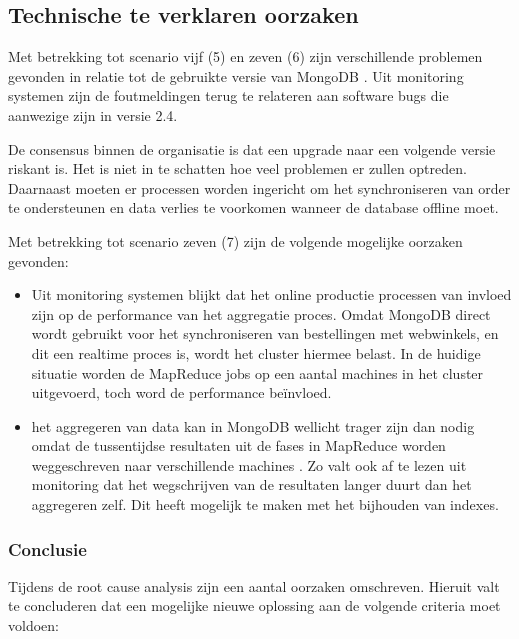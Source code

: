 \clearpage

\subsection{Technische te verklaren oorzaken}

Met betrekking tot scenario vijf (5) en zeven (6) zijn verschillende problemen gevonden in relatie tot de gebruikte versie van MongoDB \parencite{mongo_changelog}. Uit monitoring systemen zijn de foutmeldingen terug te relateren aan software bugs die aanwezige zijn in versie 2.4.

De consensus binnen de organisatie is dat een upgrade naar een volgende versie riskant is. Het is niet in te schatten hoe veel problemen er zullen optreden. Daarnaast moeten er processen worden ingericht om het synchroniseren van order te ondersteunen en data verlies te voorkomen wanneer de database offline moet.
    
Met betrekking tot scenario zeven (7) zijn de volgende mogelijke oorzaken gevonden:

\begin{itemize}
    \item Uit monitoring systemen blijkt dat het online productie processen van invloed zijn op de performance van het aggregatie proces. Omdat MongoDB direct wordt gebruikt voor het synchroniseren van bestellingen met webwinkels, en dit een realtime proces is, wordt het cluster hiermee belast. In de huidige situatie worden de MapReduce jobs op een aantal machines in het cluster uitgevoerd, toch word de performance beïnvloed.
    \item het aggregeren van data kan in MongoDB wellicht trager zijn dan nodig omdat de tussentijdse resultaten uit de fases in MapReduce worden weggeschreven naar verschillende machines \parencite{mongo_mr_shards}. Zo valt ook af te lezen uit monitoring dat het wegschrijven van de resultaten langer duurt dan het aggregeren zelf. Dit heeft mogelijk te maken met het bijhouden van indexes.  \parencite{mongo_write_performance}
\end{itemize}


\subsubsection{\textbf{Conclusie}}
\label{subsec:3.3.2}

Tijdens de root cause analysis zijn een aantal oorzaken omschreven. Hieruit valt te concluderen dat een mogelijke nieuwe oplossing aan de volgende criteria moet voldoen:

